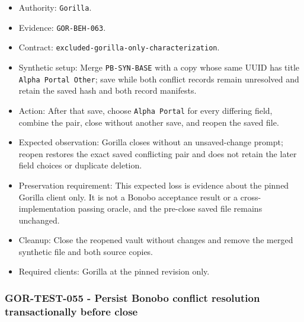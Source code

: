 \documentclass[
  letterpaper,
]{article}
\newcommand{\passthrough}[1]{#1}
\providecommand{\tightlist}{%
  \setlength{\itemsep}{0pt}\setlength{\parskip}{0pt}}
\begin{document}
\begin{itemize}
\tightlist
\item
  Authority: \passthrough{\lstinline!Gorilla!}.
\item
  Evidence: \nolinkurl{GOR-BEH-063}.
\item
  Contract: \nolinkurl{excluded-gorilla-only-characterization}.
\item
  Synthetic setup: Merge \nolinkurl{PB-SYN-BASE} with a copy whose same UUID has title
  \passthrough{\lstinline!Alpha Portal Other!}; save while both conflict records remain unresolved and retain the saved
  hash and both record manifests.
\item
  Action: After that save, choose \passthrough{\lstinline!Alpha Portal!} for every differing field, combine the pair,
  close without another save, and reopen the saved file.
\item
  Expected observation: Gorilla closes without an unsaved-change prompt; reopen restores the exact saved conflicting
  pair and does not retain the later field choices or duplicate deletion.
\item
  Preservation requirement: This expected loss is evidence about the pinned Gorilla client only. It is not a Bonobo
  acceptance result or a cross-implementation passing oracle, and the pre-close saved file remains unchanged.
\item
  Cleanup: Close the reopened vault without changes and remove the merged synthetic file and both source copies.
\item
  Required clients: Gorilla at the pinned revision only.
\end{itemize}

\subsubsection{GOR-TEST-055 - Persist Bonobo conflict resolution transactionally before
close}\label{gor-test-055---persist-bonobo-conflict-resolution-transactionally-before-close}
\end{document}

